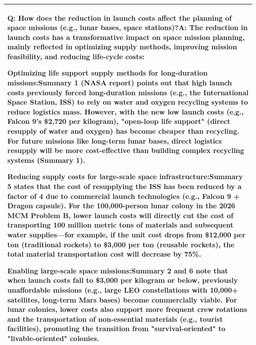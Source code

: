 \begin{longtable}[]{@{}
  >{\raggedright\arraybackslash}p{}@{}}
Q: How does the reduction in launch costs affect the planning of space
missions (e.g., lunar bases, space stations)?A: The reduction in launch
costs has a transformative impact on space mission planning, mainly
reflected in optimizing supply methods, improving mission feasibility,
and reducing life-cycle costs:

Optimizing life support supply methods for long-duration
missions:Summary 1 (NASA report) points out that high launch costs
previously forced long-duration missions (e.g., the International Space
Station, ISS) to rely on water and oxygen recycling systems to reduce
logistics mass. However, with the new low launch costs (e.g., Falcon 9's
\$2,720 per kilogram), "open-loop life support" (direct resupply of
water and oxygen) has become cheaper than recycling. For future missions
like long-term lunar bases, direct logistics resupply will be more
cost-effective than building complex recycling systems (Summary 1).

Reducing supply costs for large-scale space infrastructure:Summary 5
states that the cost of resupplying the ISS has been reduced by a factor
of 4 due to commercial launch technologies (e.g., Falcon 9 + Dragon
capsule). For the 100,000-person lunar colony in the 2026 MCM Problem B,
lower launch costs will directly cut the cost of transporting 100
million metric tons of materials and subsequent water supplies---for
example, if the unit cost drops from \$12,000 per ton (traditional
rockets) to \$3,000 per ton (reusable rockets), the total material
transportation cost will decrease by 75\%.

Enabling large-scale space missions:Summary 2 and 6 note that when
launch costs fall to \$3,000 per kilogram or below, previously
unaffordable missions (e.g., large LEO constellations with 10,000+
satellites, long-term Mars bases) become commercially viable. For lunar
colonies, lower costs also support more frequent crew rotations and the
transportation of non-essential materials (e.g., tourist facilities),
promoting the transition from "survival-oriented" to "livable-oriented"
colonies. \\
\bottomrule
\end{longtable}


